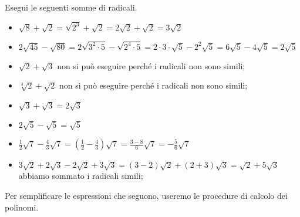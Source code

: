  \begin{esempio}
Esegui le seguenti somme di radicali.
\begin{itemize}
 \item \(\sqrt 8+\sqrt{2}=\sqrt{2^3}+\sqrt{2}=2\sqrt{2}+\sqrt{2}=3\sqrt{2}\)
 \item \(2\sqrt{45}-\sqrt{80}=2\sqrt{3^2\cdot 5}-\sqrt{2^4\cdot 5}=
        2\cdot 3\cdot \sqrt 5-2^2\sqrt 5=6\sqrt 5-4\sqrt 5=2\sqrt 5\)
 \item \(\sqrt{2}+\sqrt{3}\)
  non si può eseguire perché i radicali non sono simili;
 \item \(\sqrt[3]2+\sqrt{2}\)
  non si può eseguire perché i radicali non sono simili;
 \item \(\sqrt{3}+\sqrt{3}=2\sqrt{3}\)
 \item \(2\sqrt 5-\sqrt 5=\sqrt 5\)
 \item \(\frac 1 2\sqrt 7-\frac 4 3\sqrt 7=
        \left(\frac 1 2-\frac 4 3\right)\sqrt 7=\frac{3-8} 6\sqrt 7=
        -\frac 5 6\sqrt 7\)
 \item \(3\sqrt{2}+2\sqrt{3}-2\sqrt{2}+3\sqrt{3}=(3-2)\sqrt{2}+(2+3)\sqrt{3}=
        \sqrt{2}+5\sqrt{3}\) abbiamo sommato i radicali simili;
\end{itemize}
 \end{esempio}

Per semplificare le espressioni che seguono, useremo le procedure di 
calcolo dei polinomi.


